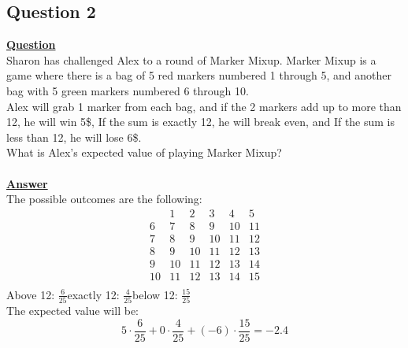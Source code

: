 \documentclass[a4, 12pt,titlepage]{scrartcl}
\begin{document}
\subsection{Question 2}
\textbf{\underline{Question}}\\
Sharon has challenged Alex to a round of Marker Mixup.
Marker Mixup is a game where there is a bag of 5 red markers numbered 1 through 5, and another bag with 5 green markers numbered 6 through 10.\\
Alex will grab 1 marker from each bag, and if the 2 markers add up to more than 12, he will win 5\$, If the sum is exactly 12, he will break even, and If the sum is less than 12, he will
lose 6\$.\\
What is Alex's expected value of playing Marker Mixup?\\
\smallskip\\
\textbf{\underline{Answer}}\\
The possible outcomes are the following:\[
\begin{array}{c|ccccc}
& 1 & 2 & 3 & 4 & 5\\
\hline
6 & 7 & 8 & 9 & 10 & 11\\
7 & 8 & 9 & 10 & 11 & 12\\
8 & 9 & 10 & 11 & 12 & 13\\
9 & 10 & 11 & 12 & 13 & 14\\
10 & 11 & 12 & 13 & 14 & 15\\
\end{array}
\]
Above 12: $\frac{6}{25}$\quad exactly 12: $\frac{4}{25}$\quad below 12: $\frac{15}{25}$\\
The expected value will be:\[
5\cdot \frac{6}{25}+0\cdot \frac{4}{25}+ (-6)\cdot \frac{15}{25}=-2.4
\]
\begin{center}
\end{center}
\newpage
\end{document}
